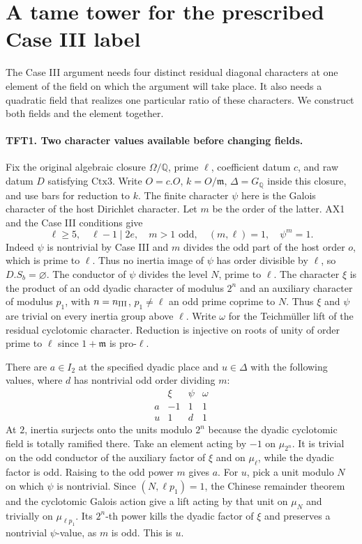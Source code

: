 \section{A tame tower for the prescribed Case III label}
\label{sec:tensor-tower-case-iii}

The Case III argument needs four distinct residual diagonal characters
at one element of the field on which the argument will take place. It
also needs a quadratic field that realizes one particular ratio of
these characters. We construct both fields and the element together.

\paragraph{TFT1. Two character values available before changing fields.}
Fix the original algebraic closure $\Omega/\mathbb Q$, prime $\ell$,
coefficient datum $c$, and raw datum $D$ satisfying $\mathrm{Ctx3}$.
Write $O=c.O$, $k=O/\mathfrak m$, $\Delta=G_{\mathbb Q}$ inside
this closure, and use bars for reduction to $k$. The finite character
$\psi$ here is the Galois character of the host Dirichlet character.
Let $m$ be the order of the latter. AX1 and the Case III conditions give
\[
 \ell\ge5,\quad \ell-1\mid 2e,\quad
 m>1\text{ odd},\quad (m,\ell)=1,\quad \psi^m=1.
\]
Indeed $\psi$ is nontrivial by Case III and $m$ divides the odd
part of the host order $o$, which is prime to $\ell$.
Thus no inertia image of $\psi$ has order divisible by $\ell$,
so $D.S_b=\varnothing$. The conductor of $\psi$ divides the level
$N$, prime to $\ell$. The character $\xi$ is the product of an odd
dyadic character of modulus $2^n$ and an auxiliary character of
modulus $p_1$, with $n=n_{\rm III}$, $p_1\ne\ell$ an odd
prime coprime to $N$. Thus $\xi$ and $\psi$ are trivial on
every inertia group above $\ell$. Write $\omega$ for the
Teichm\"uller lift of the residual cyclotomic character.
Reduction is injective on roots of unity of order prime to $\ell$
since $1+\mathfrak m$ is pro-$\ell$.

There are $a\in I_2$ at the specified dyadic place and $u\in\Delta$
with the following values, where $d$ has nontrivial odd order dividing $m$:
\[
 \begin{array}{c|ccc}
      &\xi&\psi&\omega\\ \hline
 a&-1&1&1\\
 u&1&d&1
 \end{array}
\]
At $2$, inertia surjects onto the units modulo $2^n$ because the
dyadic cyclotomic field is totally ramified there. Take an element
acting by $-1$ on $\mu_{2^n}$. It is trivial on the odd conductor
of the auxiliary factor of $\xi$ and on $\mu_\ell$, while the dyadic
factor is odd. Raising to the odd power $m$ gives $a$.
For $u$, pick a unit modulo $N$ on which $\psi$ is nontrivial.
Since $(N,\ell p_1)=1$, the Chinese remainder theorem and the
cyclotomic Galois action give a lift acting by that unit on $\mu_N$
and trivially on $\mu_{\ell p_1}$. Its $2^n$-th power kills the
dyadic factor of $\xi$ and preserves a nontrivial $\psi$-value,
as $m$ is odd. This is $u$.

